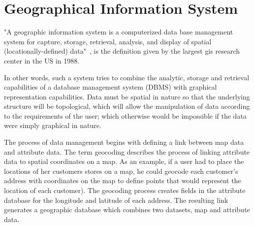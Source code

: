 \section{Geographical Information System}
\label{s:gis}



"A geographic information system is a computerized data base management system for capture, storage, retrieval, analysis, and display of spatial (locationally-defined) data"~\cite{simkowitz1988geographic}, is the definition given by the largest \acrshort{gis} research center in the US in 1988.

In other words, such a system tries to combine the analytic, storage and retrieval capabilities of a database management system (DBMS) with graphical representation capabilities. Data must be spatial in nature so that the underlying structure will be topological, which will allow the manipulation of data according to the requirements of the user; which otherwise would be impossible if the data were simply graphical in nature.  

The process of data management begins with defining a link between map data and attribute data. The term geocoding describes the process of linking attribute data to spatial coordinates on a map. As an example, if a user had to place the locations of her customers stores on a map, he could geocode each customer's address with coordinates on the map to define points that would represent the location of each customer). The geocoding process creates fields in the attribute database for the longitude and latitude of each address. The resulting link generates a geographic database which combines two datasets, map and attribute data.

